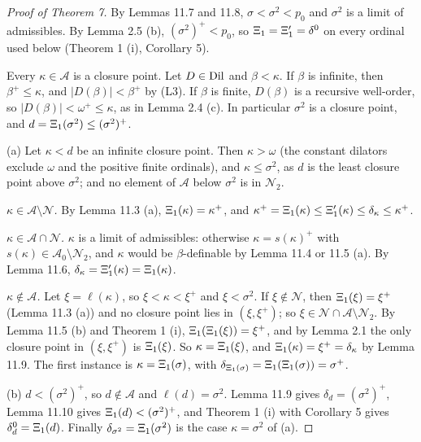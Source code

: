 \documentclass[11pt]{article}
\begin{document}
\begin{proof}[Proof of Theorem 7] By Lemmas 11.7 and 11.8, $\sigma < \sigma^2 < p_0$ and $\sigma^2$ is a limit of
admissibles. By Lemma 2.5 (b), $(\sigma^2)^+ < p_0$, so $\Xi_1 = \Xi'_1 = \delta^0_{}$ on every ordinal used below (Theorem
1 (i), Corollary 5).

Every $\kappa \in \mathcal A$ is a closure point. Let $D \in \mathrm{Dil}$ and $\beta < \kappa$. If $\beta$ is infinite,
then $\beta^+ \le \kappa$, and $|D(\beta)| < \beta^+$ by (L3). If $\beta$ is finite, $D(\beta)$ is a recursive
well-order, so $|D(\beta)| < \omega^+ \le \kappa$, as in Lemma 2.4 (c). In particular $\sigma^2$ is a closure
point, and $d = \Xi_1(\sigma^2) \le (\sigma^2)^+$.

(a) Let $\kappa < d$ be an infinite closure point. Then $\kappa > \omega$ (the constant dilators exclude $\omega$
and the positive finite ordinals), and $\kappa \le \sigma^2$, as $d$ is the least closure point above
$\sigma^2$; and no element of $\mathcal A$ below $\sigma^2$ is in $\mathcal N_2$.

\emph{$\kappa \in \mathcal A \setminus \mathcal N$.} By Lemma 11.3 (a), $\Xi_1(\kappa) = \kappa^+$, and
$\kappa^+ = \Xi_1(\kappa) \le \Xi'_1(\kappa) \le \delta_{\kappa} \le \kappa^+$.

\emph{$\kappa \in \mathcal A \cap \mathcal N$.} $\kappa$ is a limit of admissibles: otherwise
$\kappa = s(\kappa)^+$ with $s(\kappa) \in \mathcal A_0 \setminus \mathcal N_2$, and $\kappa$ would be
$\beta$-definable by Lemma 11.4 or 11.5 (a). By Lemma 11.6, $\delta_{\kappa} = \Xi'_1(\kappa) = \Xi_1(\kappa)$.

\emph{$\kappa \notin \mathcal A$.} Let $\xi = \ell(\kappa)$, so $\xi < \kappa < \xi^+$ and $\xi < \sigma^2$. If
$\xi \notin \mathcal N$, then $\Xi_1(\xi) = \xi^+$ (Lemma 11.3 (a)) and no closure point lies in $(\xi, \xi^+)$; so
$\xi \in \mathcal N \cap \mathcal A \setminus \mathcal N_2$. By Lemma 11.5 (b) and Theorem 1 (i),
$\Xi_1(\Xi_1(\xi)) = \xi^+$, and by Lemma 2.1 the only closure point in $(\xi, \xi^+)$ is $\Xi_1(\xi)$. So
$\kappa = \Xi_1(\xi)$, and $\Xi_1(\kappa) = \xi^+ = \delta_{\kappa}$ by Lemma 11.9. The first instance is
$\kappa = \Xi_1(\sigma)$, with $\delta_{\Xi_1(\sigma)} = \Xi_1(\Xi_1(\sigma)) = \sigma^+$.

(b) $d < (\sigma^2)^+$, so $d \notin \mathcal A$ and $\ell(d) = \sigma^2$. Lemma 11.9 gives
$\delta_d = (\sigma^2)^+$, Lemma 11.10 gives $\Xi_1(d) < (\sigma^2)^+$, and Theorem 1 (i) with Corollary 5 gives
$\delta^0_{d} = \Xi_1(d)$. Finally $\delta_{\sigma^2} = \Xi_1(\sigma^2)$ is the case $\kappa = \sigma^2$ of (a).
\end{proof}
\end{document}
